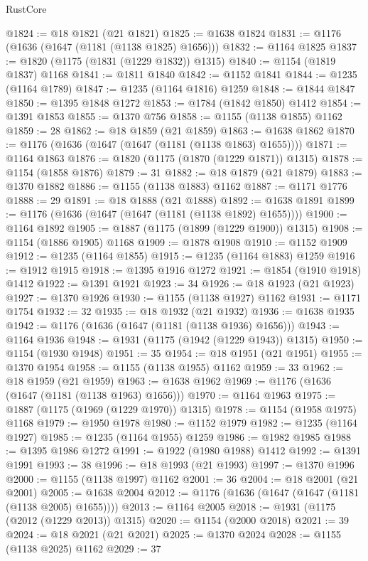 \begin{lexlean}{RustCore}
\begin{coremodule}
@1824 := @18 @1821 (@21 @1821)
@1825 := @1638 @1824
@1831 := @1176 (@1636 (@1647 (@1181 (@1138 @1825) @1656)))
@1832 := @1164 @1825
@1837 := @1820 (@1175 (@1831 (@1229 @1832)) @1315)
@1840 := @1154 (@1819 @1837) @1168
@1841 := @1811 @1840
@1842 := @1152 @1841
@1844 := @1235 (@1164 @1789)
@1847 := @1235 (@1164 @1816) @1259
@1848 := @1844 @1847
@1850 := @1395 @1848 @1272
@1853 := @1784 (@1842 @1850) @1412
@1854 := @1391 @1853
@1855 := @1370 @756
@1858 := @1155 (@1138 @1855) @1162
@1859 := 28
@1862 := @18 @1859 (@21 @1859)
@1863 := @1638 @1862
@1870 := @1176 (@1636 (@1647 (@1647 (@1181 (@1138 @1863) @1655))))
@1871 := @1164 @1863
@1876 := @1820 (@1175 (@1870 (@1229 @1871)) @1315)
@1878 := @1154 (@1858 @1876)
@1879 := 31
@1882 := @18 @1879 (@21 @1879)
@1883 := @1370 @1882
@1886 := @1155 (@1138 @1883) @1162
@1887 := @1171 @1776
@1888 := 29
@1891 := @18 @1888 (@21 @1888)
@1892 := @1638 @1891
@1899 := @1176 (@1636 (@1647 (@1647 (@1181 (@1138 @1892) @1655))))
@1900 := @1164 @1892
@1905 := @1887 (@1175 (@1899 (@1229 @1900)) @1315)
@1908 := @1154 (@1886 @1905) @1168
@1909 := @1878 @1908
@1910 := @1152 @1909
@1912 := @1235 (@1164 @1855)
@1915 := @1235 (@1164 @1883) @1259
@1916 := @1912 @1915
@1918 := @1395 @1916 @1272
@1921 := @1854 (@1910 @1918) @1412
@1922 := @1391 @1921
@1923 := 34
@1926 := @18 @1923 (@21 @1923)
@1927 := @1370 @1926
@1930 := @1155 (@1138 @1927) @1162
@1931 := @1171 @1754
@1932 := 32
@1935 := @18 @1932 (@21 @1932)
@1936 := @1638 @1935
@1942 := @1176 (@1636 (@1647 (@1181 (@1138 @1936) @1656)))
@1943 := @1164 @1936
@1948 := @1931 (@1175 (@1942 (@1229 @1943)) @1315)
@1950 := @1154 (@1930 @1948)
@1951 := 35
@1954 := @18 @1951 (@21 @1951)
@1955 := @1370 @1954
@1958 := @1155 (@1138 @1955) @1162
@1959 := 33
@1962 := @18 @1959 (@21 @1959)
@1963 := @1638 @1962
@1969 := @1176 (@1636 (@1647 (@1181 (@1138 @1963) @1656)))
@1970 := @1164 @1963
@1975 := @1887 (@1175 (@1969 (@1229 @1970)) @1315)
@1978 := @1154 (@1958 @1975) @1168
@1979 := @1950 @1978
@1980 := @1152 @1979
@1982 := @1235 (@1164 @1927)
@1985 := @1235 (@1164 @1955) @1259
@1986 := @1982 @1985
@1988 := @1395 @1986 @1272
@1991 := @1922 (@1980 @1988) @1412
@1992 := @1391 @1991
@1993 := 38
@1996 := @18 @1993 (@21 @1993)
@1997 := @1370 @1996
@2000 := @1155 (@1138 @1997) @1162
@2001 := 36
@2004 := @18 @2001 (@21 @2001)
@2005 := @1638 @2004
@2012 := @1176 (@1636 (@1647 (@1647 (@1181 (@1138 @2005) @1655))))
@2013 := @1164 @2005
@2018 := @1931 (@1175 (@2012 (@1229 @2013)) @1315)
@2020 := @1154 (@2000 @2018)
@2021 := 39
@2024 := @18 @2021 (@21 @2021)
@2025 := @1370 @2024
@2028 := @1155 (@1138 @2025) @1162
@2029 := 37

\end{coremodule}
\end{lexlean}
